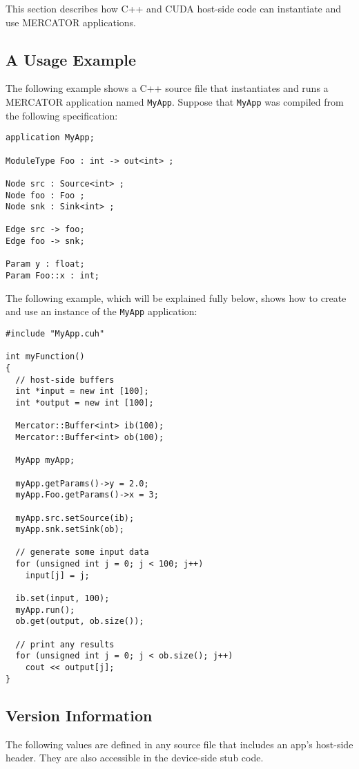 \documentclass[11pt]{article}
\begin{document}
This section describes how C++ and CUDA host-side code can instantiate
and use MERCATOR applications.  

\subsection{A Usage Example}

The following example shows a C++ source file that instantiates and runs
a MERCATOR application named \texttt{MyApp}.  Suppose that \texttt{MyApp}
was compiled from the following specification:
\begin{verbatim}
application MyApp;

ModuleType Foo : int -> out<int> ;

Node src : Source<int> ;
Node foo : Foo ;
Node snk : Sink<int> ;

Edge src -> foo;
Edge foo -> snk;

Param y : float;
Param Foo::x : int;

\end{verbatim}
The following example, which will be explained fully below, shows how
to create and use an instance of the \texttt{MyApp} application:
\begin{verbatim}
#include "MyApp.cuh"

int myFunction()
{
  // host-side buffers
  int *input = new int [100];  
  int *output = new int [100];  

  Mercator::Buffer<int> ib(100);
  Mercator::Buffer<int> ob(100);

  MyApp myApp;

  myApp.getParams()->y = 2.0;
  myApp.Foo.getParams()->x = 3;

  myApp.src.setSource(ib);
  myApp.snk.setSink(ob);

  // generate some input data
  for (unsigned int j = 0; j < 100; j++)
    input[j] = j;

  ib.set(input, 100);
  myApp.run();
  ob.get(output, ob.size());

  // print any results
  for (unsigned int j = 0; j < ob.size(); j++)
    cout << output[j];
}
\end{verbatim}

\subsection{Version Information}

The following values are defined in any source file that includes an
app's host-side header.  They are also accessible in the device-side
stub code.
\end{document}
